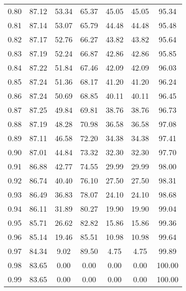 \begin{tabular}{|c|c|c|c|c|c|c|}
      0.80 &     87.12 &     53.34 &      65.37 &   45.05 &      45.05 &         95.34 \\
      0.81 &     87.14 &     53.07 &      65.79 &   44.48 &      44.48 &         95.48 \\
      0.82 &     87.17 &     52.76 &      66.27 &   43.82 &      43.82 &         95.64 \\
      0.83 &     87.19 &     52.24 &      66.87 &   42.86 &      42.86 &         95.85 \\
      0.84 &     87.22 &     51.84 &      67.46 &   42.09 &      42.09 &         96.03 \\
      0.85 &     87.24 &     51.36 &      68.17 &   41.20 &      41.20 &         96.24 \\
      0.86 &     87.24 &     50.69 &      68.85 &   40.11 &      40.11 &         96.45 \\
      0.87 &     87.25 &     49.84 &      69.81 &   38.76 &      38.76 &         96.73 \\
      0.88 &     87.19 &     48.28 &      70.98 &   36.58 &      36.58 &         97.08 \\
      0.89 &     87.11 &     46.58 &      72.20 &   34.38 &      34.38 &         97.41 \\
      0.90 &     87.01 &     44.84 &      73.32 &   32.30 &      32.30 &         97.70 \\
      0.91 &     86.88 &     42.77 &      74.55 &   29.99 &      29.99 &         98.00 \\
      0.92 &     86.74 &     40.40 &      76.10 &   27.50 &      27.50 &         98.31 \\
      0.93 &     86.49 &     36.83 &      78.07 &   24.10 &      24.10 &         98.68 \\
      0.94 &     86.11 &     31.89 &      80.27 &   19.90 &      19.90 &         99.04 \\
      0.95 &     85.71 &     26.62 &      82.82 &   15.86 &      15.86 &         99.36 \\
      0.96 &     85.14 &     19.46 &      85.51 &   10.98 &      10.98 &         99.64 \\
      0.97 &     84.34 &      9.02 &      89.50 &    4.75 &       4.75 &         99.89 \\
      0.98 &     83.65 &      0.00 &       0.00 &    0.00 &       0.00 &        100.00 \\
      0.99 &     83.65 &      0.00 &       0.00 &    0.00 &       0.00 &        100.00 \\
\bottomrule
\end{tabular}
